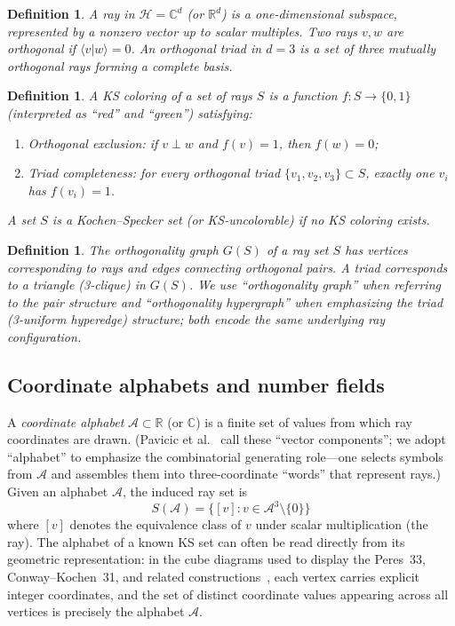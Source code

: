 \documentclass[12pt,a4paper]{article}
\newtheorem{definition}[theorem]{Definition}
\newcommand{\R}{\mathbb{R}}
\newcommand{\C}{\mathbb{C}}
\newcommand{\braket}[2]{\langle#1|#2\rangle}
\begin{document}
\begin{definition}
A \emph{ray} in $\mathcal{H} = \C^d$ (or $\R^d$) is a one-dimensional subspace, represented by a nonzero vector up to scalar multiples. Two rays $v, w$ are \emph{orthogonal} if $\braket{v}{w} = 0$. An \emph{orthogonal triad} in $d = 3$ is a set of three mutually orthogonal rays forming a complete basis.
\end{definition}

\begin{definition}
A \emph{KS coloring} of a set of rays $S$ is a function $f: S \to \{0, 1\}$ (interpreted as ``red'' and ``green'') satisfying:
\begin{enumerate}[label=(\alph*)]
    \item \emph{Orthogonal exclusion}: if $v \perp w$ and $f(v) = 1$, then $f(w) = 0$;
    \item \emph{Triad completeness}: for every orthogonal triad $\{v_1, v_2, v_3\} \subset S$, exactly one $v_i$ has $f(v_i) = 1$.
\end{enumerate}
A set $S$ is a \emph{Kochen--Specker set} (or \emph{KS-uncolorable}) if no KS coloring exists.
\end{definition}

\begin{definition}
The \emph{orthogonality graph} $G(S)$ of a ray set $S$ has vertices corresponding to rays and edges connecting orthogonal pairs. A \emph{triad} corresponds to a triangle (3-clique) in $G(S)$. We use ``orthogonality graph'' when referring to the pair structure and ``orthogonality hypergraph'' when emphasizing the triad (3-uniform hyperedge) structure; both encode the same underlying ray configuration.
\end{definition}

\subsection{Coordinate alphabets and number fields}

A \emph{coordinate alphabet} $\mathcal{A} \subset \R$ (or $\C$) is a finite set of values from which ray coordinates are drawn.  (Pavicic et al.~\cite{Pavicic2019} call these ``vector components''; we adopt ``alphabet'' to emphasize the combinatorial generating role---one selects symbols from $\mathcal{A}$ and assembles them into three-coordinate ``words'' that represent rays.)  Given an alphabet $\mathcal{A}$, the induced ray set is
\[
S(\mathcal{A}) = \{ [v] : v \in \mathcal{A}^3 \setminus \{0\} \}
\]
where $[v]$ denotes the equivalence class of $v$ under scalar multiplication (the ray).  The alphabet of a known KS set can often be read directly from its geometric representation: in the cube diagrams used to display the Peres~33, Conway--Kochen~31, and related constructions~\cite{Peres1991,Peres1993}, each vertex carries explicit integer coordinates, and the set of distinct coordinate values appearing across all vertices is precisely the alphabet $\mathcal{A}$.
\end{document}
